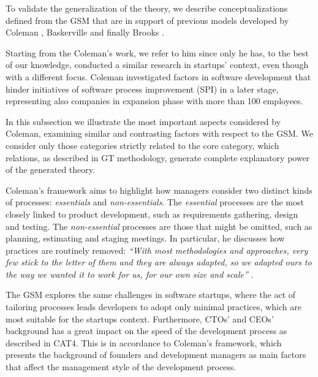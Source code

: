 \documentclass[10pt,journal,letterpaper,compsoc]{IEEEtran}
\begin{document}
To validate the generalization of the theory, we describe conceptualizations 
defined from the GSM that are in support of previous models developed by 
Coleman \cite{Coleman2007,Coleman2008a, Coleman2008}, Baskerville \cite{Internet} and finally Brooks \cite{BrooksJr1987}. 

Starting from the Coleman's work, we refer to him since only he has, to the best of our knowledge, 
conducted a similar research in startups' context, even though with a 
different focus. Coleman investigated 
factors in software development that hinder initiatives of software process 
improvement (SPI) in a later stage, representing also companies in expansion phase with more than 100 employees. %

In this subsection we illustrate the most important aspects considered by 
Coleman, examining similar and contrasting factors with respect to the GSM. We 
consider only those categories strictly related to the core category, which 
relations, as described in GT methodology, generate complete explanatory power 
of the generated theory. 

Coleman's framework aims to highlight how managers consider two distinct kinds 
of processes: \textit{essentials} and \textit{non-essentials}. The 
\textit{essential} processes are the most closely linked to product development, 
such as requirements gathering, design and testing. The \textit{non-essential} 
processes are those that might be omitted, such as planning, estimating and 
staging meetings. In particular, he discusses how practices are routinely 
removed: \textit{``With most methodologies and approaches, very few stick to the 
letter of them and they are always adapted, so we adapted ours to the way we 
wanted it to work for us, for our own size and scale''} \cite{Coleman2008}. %

The GSM explores the same challenges in software startups, where the act of 
tailoring processes leads developers to adopt only minimal practices, which are 
most suitable for the startups context. Furthermore, CTOs' and CEOs' background 
has a great impact on the speed of the development process as described in CAT4. 
This is in accordance to Coleman's framework, which presents the background of 
founders and development managers as main factors that affect the management 
style of the development process.
\end{document}

